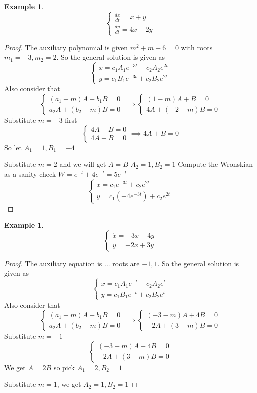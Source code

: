 \documentclass[oneside,11pt,pdftex,final]{book}%
\numberwithin{equation}{section}
\newtheorem{example}[theorem]{Example}
\numberwithin{section}{chapter}
\numberwithin{equation}{chapter}
\begin{document}
\begin{example}
	\[ \begin{cases}
		\frac{dx}{dt}=x+y\\
		\frac{dy}{dt}=4x-2y
	\end{cases} \]
\end{example}
\begin{proof}
	The auxiliary polynomial is given $ m^2+m-6=0 $ with roots $ m_1=-3, m_2=2 $.
	So the general solution is given as
	\[ \begin{cases}
		x=c_1A_1e^{-3t}+c_2A_2e^{2t}\\
		y=c_1B_1e^{-3t}+c_2B_2e^{2t}
	\end{cases} \]
	Also consider that
	\[ \begin{cases}
		(a_1-m)A+b_1B=0\\
		a_2A+(b_2-m)B=0
	\end{cases} \implies 
\begin{cases}
	(1-m)A+B=0\\
	4A+(-2-m)B=0
\end{cases}\]
Substitute $ m=-3 $ first
\[ \begin{cases}
	4A+B=0\\
	4A+B=0
\end{cases} \implies 4A+B=0\]
So let $ A_1=1, B_1=-4 $

Substitute $ m=2 $ and we will get $ A=B $
$ A_2=1,B_2=1 $
Compute the Wronskian as a sanity check $ W=e^{-t}+4e^{-t}=5e^{-t} $
	\[ \begin{cases}
	x=c_1e^{-3t}+c_2e^{2t}\\
	y=c_1(-4e^{-3t})+c_2e^{2t}
\end{cases} \]
\end{proof}

\begin{example}
	\[ \begin{cases}
		\dot{x}=-3x+4y\\
		\dot{y}=-2x+3y
	\end{cases} \]
\end{example}
\begin{proof}
	The auxiliary equation is $ ...$ roots are $ -1,1 $.
		So the general solution is given as
	\[ \begin{cases}
		x=c_1A_1e^{-t}+c_2A_2e^{t}\\
		y=c_1B_1e^{-t}+c_2B_2e^{t}
	\end{cases} \]
	Also consider that
	\[ \begin{cases}
		(a_1-m)A+b_1B=0\\
		a_2A+(b_2-m)B=0
	\end{cases} \implies 
	\begin{cases}
		(-3-m)A+4B=0\\
		-2A+(3-m)B=0
	\end{cases}\]
Substitute $ m=-1 $
\[ \begin{cases}
	(-3-m)A+4B=0\\
	-2A+(3-m)B=0
\end{cases} \]
We get $ A=2B $ so pick $ A_1=2,B_2=1 $

Substitute $ m=1 $, we get $ A_2=1,B_2=1 $
\end{proof}
\end{document}
